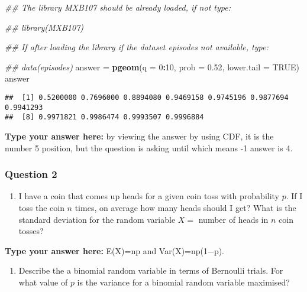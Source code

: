 \documentclass[
]{article}
\newenvironment{Shaded}{\begin{snugshade}}{\end{snugshade}}
\newcommand{\CommentTok}[1]{\textcolor[rgb]{0.56,0.35,0.01}{\textit{#1}}}
\newcommand{\DataTypeTok}[1]{\textcolor[rgb]{0.13,0.29,0.53}{#1}}
\newcommand{\DecValTok}[1]{\textcolor[rgb]{0.00,0.00,0.81}{#1}}
\newcommand{\FloatTok}[1]{\textcolor[rgb]{0.00,0.00,0.81}{#1}}
\newcommand{\KeywordTok}[1]{\textcolor[rgb]{0.13,0.29,0.53}{\textbf{#1}}}
\newcommand{\NormalTok}[1]{#1}
\newcommand{\OperatorTok}[1]{\textcolor[rgb]{0.81,0.36,0.00}{\textbf{#1}}}
\newcommand{\OtherTok}[1]{\textcolor[rgb]{0.56,0.35,0.01}{#1}}
\newcommand{\StringTok}[1]{\textcolor[rgb]{0.31,0.60,0.02}{#1}}
\providecommand{\tightlist}{%
  \setlength{\itemsep}{0pt}\setlength{\parskip}{0pt}}
\begin{document}
\begin{Shaded}
\begin{Highlighting}[]
\CommentTok{##  The library MXB107 should be already loaded, if not type:}

\CommentTok{##  library(MXB107)}

\CommentTok{##  If after loading the library if the dataset episodes not available, type:}

\CommentTok{##  data(episodes)}
\NormalTok{answer =}\StringTok{ }\KeywordTok{pgeom}\NormalTok{(}\DataTypeTok{q =} \DecValTok{0}\OperatorTok{:}\DecValTok{10}\NormalTok{, }\DataTypeTok{prob =} \FloatTok{0.52}\NormalTok{, }\DataTypeTok{lower.tail =} \OtherTok{TRUE}\NormalTok{)}
\NormalTok{answer }
\end{Highlighting}
\end{Shaded}

\begin{verbatim}
##  [1] 0.5200000 0.7696000 0.8894080 0.9469158 0.9745196 0.9877694 0.9941293
##  [8] 0.9971821 0.9986474 0.9993507 0.9996884
\end{verbatim}

\textbf{Type your answer here:} by viewing the answer by using CDF, it
is the number 5 position, but the question is asking until which means
-1 answer is 4.

\hypertarget{question-2-2}{%
\subsubsection{Question 2}\label{question-2-2}}

\begin{enumerate}
\def\labelenumi{\alph{enumi}.}
\tightlist
\item
  I have a coin that comes up heads for a given coin toss with
  probability \(p\). If I toss the coin \(n\) times, on average how many
  heads should I get? What is the standard deviation for the random
  variable \(X=\) number of heads in \(n\) coin tosses?
\end{enumerate}

\textbf{Type your answer here:} E(X)=np and Var(X)=np(1−p).

\begin{enumerate}
\def\labelenumi{\alph{enumi}.}
\setcounter{enumi}{1}
\tightlist
\item
  Describe the a binomial random variable in terms of Bernoulli trials.
  For what value of \(p\) is the variance for a binomial random variable
  maximised?
\end{enumerate}
\end{document}
